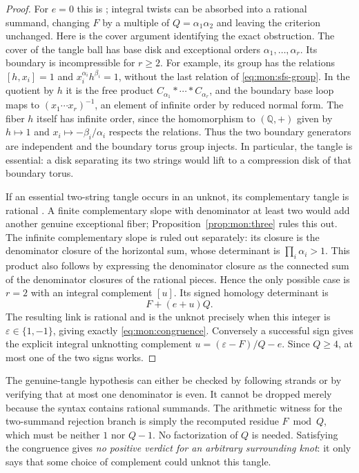 \begin{proof}
For $e=0$ this is \cite[Theorem~4.9(a)]{nogueira-salgueiro}; integral twists
can be absorbed into a rational summand, changing $F$ by a multiple of
$Q=\alpha_1\alpha_2$ and leaving the criterion unchanged.
Here is the cover argument identifying the exact obstruction.
The cover of the tangle ball has base disk and exceptional orders
$\alpha_1,\ldots,\alpha_r$.  Its boundary is incompressible for $r\ge2$.
For example, its group has the relations $[h,x_i]=1$ and
$x_i^{\alpha_i}h^{\beta_i}=1$, without the last relation of
\eqref{eq:mon:sfs-group}.  In the quotient by $h$ it is the free product
$C_{\alpha_1}*\cdots*C_{\alpha_r}$, and the boundary base loop maps to
$(x_1\cdots x_r)^{-1}$, an element of infinite order by reduced normal form.
The fiber $h$ itself has infinite order, since the homomorphism to
$(\mathbb Q,+)$ given by $h\mapsto1$ and
$x_i\mapsto-\beta_i/\alpha_i$ respects the relations.  Thus the two
boundary generators are independent and the boundary torus group injects.
In particular, the tangle is essential: a disk separating its two strings
would lift to a compression disk of that boundary torus.

If an essential two-string tangle occurs in an unknot, its complementary
tangle is rational \cite[Proposition~4.4]{nogueira-salgueiro}.
A finite complementary slope with denominator at least two would add another
genuine exceptional fiber; Proposition~\ref{prop:mon:three} rules this out.
The infinite complementary slope is ruled out separately: its closure is the
denominator closure of the horizontal sum, whose determinant is
$\prod_i\alpha_i>1$.  This product also follows by expressing the
denominator closure as the connected sum of the denominator closures of the
rational pieces.  Hence the only possible case is $r=2$ with an integral
complement $[u]$.  Its signed homology determinant is
\[
 F+(e+u)Q.
\]
The resulting link is rational and is the unknot precisely when this integer
is $\varepsilon\in\{1,-1\}$, giving exactly
\eqref{eq:mon:congruence}.  Conversely a successful sign gives the explicit
integral unknotting complement $u=(\varepsilon-F)/Q-e$.
Since $Q\ge4$, at most one of the two signs works.
\end{proof}

The genuine-tangle hypothesis can either be checked by following strands or
by verifying that at most one denominator is even.  It cannot be dropped
merely because the syntax contains rational summands.  The arithmetic witness
for the two-summand rejection branch is simply the recomputed residue
$F\bmod Q$, which must be neither $1$ nor $Q-1$.  No factorization of $Q$ is
needed.  Satisfying the congruence gives \emph{no positive verdict for an
arbitrary surrounding knot}: it only says that some choice of complement
could unknot this tangle.

